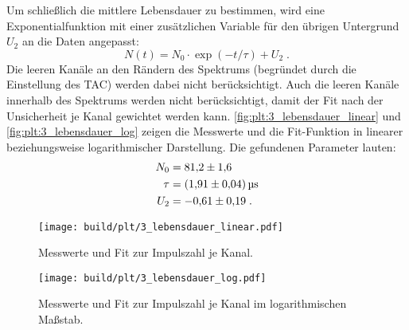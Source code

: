 Um schließlich die mittlere Lebensdauer zu bestimmen,
wird eine Exponentialfunktion mit einer zusätzlichen Variable für den übrigen Untergrund $U_2$ an die Daten angepasst:
\begin{equation*}
    N(t) = N_0 \cdot \exp (-t / \tau) + U_2 \; .
\end{equation*}
Die leeren Kanäle an den Rändern des Spektrums (begründet durch die Einstellung des \ac{TAC}) werden dabei nicht berücksichtigt.
Auch die leeren Kanäle innerhalb des Spektrums werden nicht berücksichtigt,
damit der Fit nach der Unsicherheit je Kanal gewichtet werden kann.
\autoref{fig:plt:3_lebensdauer_linear} und \autoref{fig:plt:3_lebensdauer_log} zeigen die Messwerte und die Fit-Funktion
in linearer beziehungsweise logarithmischer Darstellung.
Die gefundenen Parameter lauten:
\begin{align*}
    N_0 &= \num{81.2 \pm 1.6} \\
    \tau &= \SI{1.91 \pm 0.04}{\micro\second} \\
    U_2 &= \num{-0.61 \pm 0.19} \; .
\end{align*}

\begin{figure}
    \centering
    \texttt{[image: build/plt/3\_lebensdauer\_linear.pdf]}
    \caption{Messwerte und Fit zur Impulszahl je Kanal.}
    \label{fig:plt:3_lebensdauer_linear}
\end{figure}

\begin{figure}
    \centering
    \texttt{[image: build/plt/3\_lebensdauer\_log.pdf]}
    \caption{Messwerte und Fit zur Impulszahl je Kanal im logarithmischen Maßstab.}
    \label{fig:plt:3_lebensdauer_log}
\end{figure}
